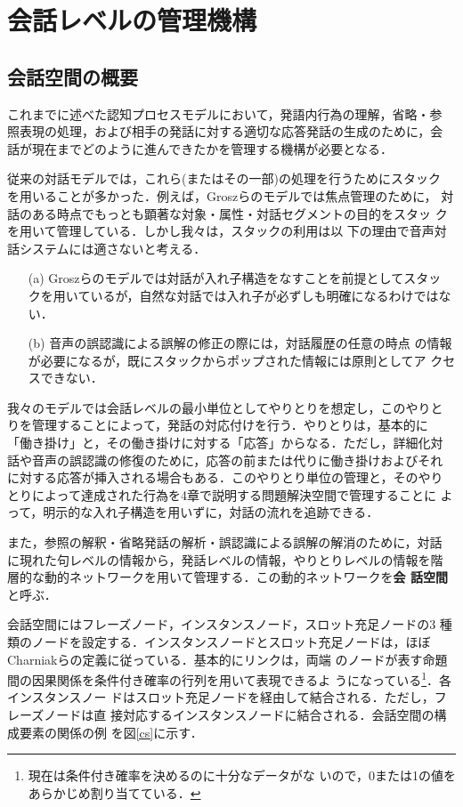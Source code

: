 \vspace{-3mm}
\section{会話レベルの管理機構}
\label{conv}

\subsection{会話空間の概要}

これまでに述べた認知プロセスモデルにおいて，発語内行為の理解，省略・参
照表現の処理，および相手の発話に対する適切な応答発話の生成のために，会
話が現在までどのように進んできたかを管理する機構が必要となる．

従来の対話モデルでは，これら(またはその一部)の処理を行うためにスタック
を用いることが多かった．例えば，Groszらのモデルでは焦点管理のために，
対話のある時点でもっとも顕著な対象・属性・対話セグメントの目的をスタッ
クを用いて管理している\cite{grosz86}．しかし我々は，スタックの利用は以
下の理由で音声対話システムには適さないと考える．

\begin{enumerate}
\item[(a)]  Groszらのモデルでは対話が入れ子構造をなすことを前提としてスタッ
クを用いているが，自然な対話では入れ子が必ずしも明確になるわけではない．

\item[(b)] 音声の誤認識による誤解の修正の際には，対話履歴の任意の時点
の情報が必要になるが，既にスタックからポップされた情報には原則としてア
クセスできない．

\end{enumerate}

我々のモデルでは会話レベルの最小単位としてやりとりを想定し，このやりと
りを管理することによって，発話の対応付けを行う．やりとりは，基本的に
「働き掛け」と，その働き掛けに対する「応答」からなる．ただし，詳細化対
話や音声の誤認識の修復のために，応答の前または代りに働き掛けおよびそれ
に対する応答が挿入される場合もある．このやりとり単位の管理と，そのやり
とりによって達成された行為を4章で説明する問題解決空間で管理することに
よって，明示的な入れ子構造を用いずに，対話の流れを追跡できる．

また，参照の解釈・省略発話の解析・誤認識による誤解の解消のために，対話
に現れた句レベルの情報から，発話レベルの情報，やりとりレベルの情報を階
層的な動的ネットワークを用いて管理する．この動的ネットワークを{\bf 会
話空間}と呼ぶ．

会話空間にはフレーズノード，インスタンスノード，スロット充足ノードの3
種類のノードを設定する．インスタンスノードとスロット充足ノードは，ほぼ
Charniakらの定義\cite{charniak93}に従っている．基本的にリンクは，両端
のノードが表す命題間の因果関係を条件付き確率の行列を用いて表現できるよ
うになっている\footnote{現在は条件付き確率を決めるのに十分なデータがな
いので，0または1の値をあらかじめ割り当てている．}．各インスタンスノー
ドはスロット充足ノードを経由して結合される．ただし，フレーズノードは直
接対応するインスタンスノードに結合される．会話空間の構成要素の関係の例
を図\ref{cs}に示す．

